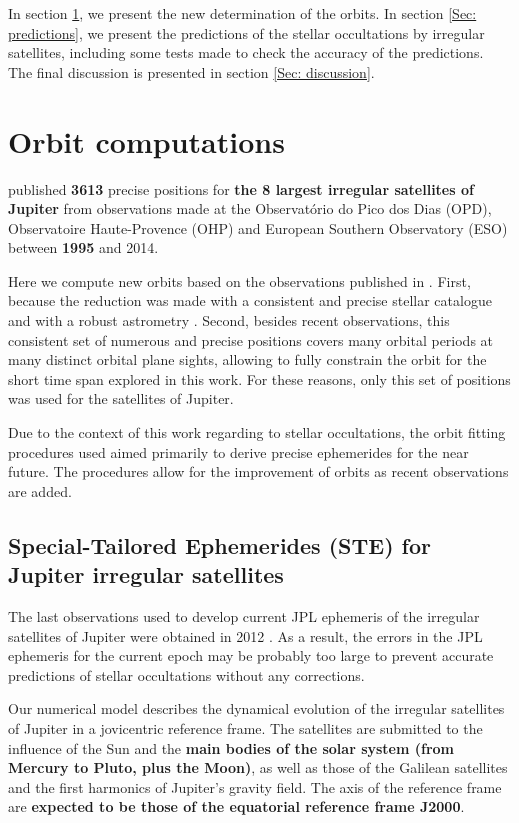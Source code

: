 \documentclass[useAMS,usenatbib]{mn2e}
\begin{document}
In section \ref{Sec: integration}, we present the new determination of the orbits. In section \ref{Sec: predictions}, we present the predictions of the stellar occultations by irregular satellites, including some tests made to check the accuracy of the predictions. The final discussion is presented in section \ref{Sec: discussion}.

\section{Orbit computations} \label{Sec: integration}

 published \textbf{3613} precise positions for \textbf{the 8 largest irregular satellites of Jupiter} from observations made at the Observatório do Pico dos Dias (OPD), Observatoire Haute-Provence (OHP) and European Southern Observatory (ESO) between \textbf{1995} and 2014. 

Here we compute new orbits based on the observations published in . First, because the reduction was made with a consistent and precise stellar catalogue and with a robust astrometry \citep[PRAIA,][]{Assafin2011}. Second, besides recent observations, this consistent set of numerous and precise positions covers many orbital periods at many distinct orbital plane sights, allowing to fully constrain the orbit for the short time span explored in this work. For these reasons, only this set of positions was used for the satellites of Jupiter.

Due to the context of this work regarding to stellar occultations, the orbit fitting procedures used aimed primarily to derive precise ephemerides for the near future. The procedures allow for the improvement of orbits as recent observations are added.

\subsection{Special-Tailored Ephemerides (STE) for Jupiter irregular satellites}

The last observations used to develop current JPL ephemeris of the irregular satellites of Jupiter were obtained in 2012 \citep{Jacobson2012}. As a result, the errors in the JPL ephemeris for the current epoch may be probably too large to prevent accurate predictions of stellar occultations without any corrections.

Our numerical model describes the dynamical evolution of the irregular satellites of Jupiter in a jovicentric reference frame. The satellites are submitted to the influence of the Sun and the \textbf{main bodies of the solar system (from Mercury to Pluto, plus the Moon)}, as well as those of the Galilean satellites and the first harmonics of Jupiter's gravity field. The axis of the reference frame are \textbf{expected to be those of the equatorial reference frame J2000}.
\end{document}

